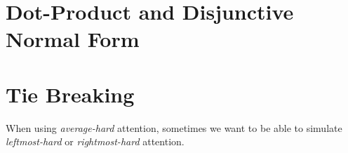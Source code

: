\iffalse
\subsection{$-|\text{Dot-product}|$ attention}

\citep{perez-etal-2021-turing}
\fi

\section{Dot-Product and Disjunctive Normal Form}
\label{sec:att_dnf}

\section{Tie Breaking}

When using \emph{average-hard} attention, sometimes we want to be able to simulate \emph{leftmost-hard} or \emph{rightmost-hard} attention.
